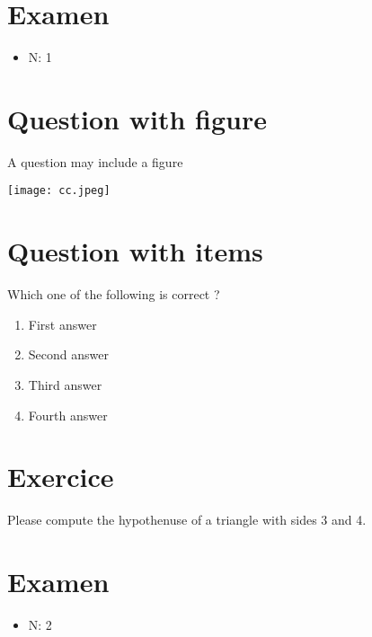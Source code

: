 \documentclass[a4paper,11pt,twoside]{article}
\author{Giuseppe Lipari}
\date{\today}
\title{}
\begin{document}
\pagestyle{empty}

\thispagestyle{empty}

\section*{Examen}
\label{sec:org3038f4a}
\begin{itemize}
\item N: 1
\end{itemize}
\section*{Question with figure}
\label{sec:orgd88e35a}


A question may include a figure

\begin{center}
\texttt{[image: cc.jpeg]}
\end{center}



\section*{Question with items}
\label{sec:org74fbf56}

Which one of the following is correct ?

\begin{enumerate}
\item First answer
\item Second answer
\item Third answer
\item Fourth answer
\end{enumerate}



\section*{Exercice}
\label{sec:org86d2b00}

Please compute the hypothenuse of a triangle with sides 3 and 4.



\subsection*{}
\label{sec:orge63d17a}

\cleardoublepage

\section*{Examen}
\label{sec:orgd6ee69b}
\begin{itemize}
\item N: 2
\end{itemize}
\end{document}
